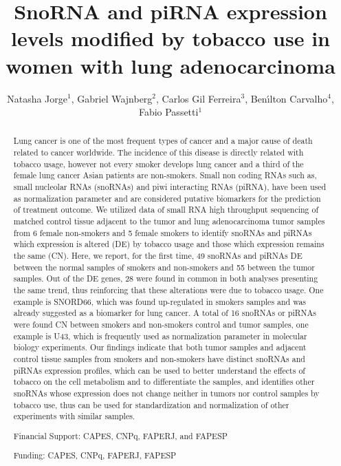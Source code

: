 \documentclass[twoside]{article}
\title{\vspace{-15mm}\fontsize{24pt}{10pt}\selectfont\textbf{SnoRNA and piRNA expression levels modified by tobacco use in women with lung adenocarcinoma}} %
\author{Natasha Jorge$^1$, Gabriel Wajnberg$^2$, Carlos Gil Ferreira$^3$, Ben\'{\i}lton Carvalho$^4$, Fabio Passetti$^1$}
\affil{1 FIOCRUZ - IOC\\ 2 FIOCRUZ-IOC\\ 3 D'OR INSTITUTE FOR RESERACH AND EDUCATION, RIO DE JANEIRO, RJ, BRAZIL\\ 4 DEPARTMENT OF STATISTICS, STATE UNICAMP, CAMPINAS, SP, BRAZIL\\ }
\date{}
\begin{document}
\maketitle %

\thispagestyle{fancy} %


\begin{abstract}
Lung cancer is one of the most frequent types of cancer and a major cause of death related to cancer worldwide. The incidence of this disease is directly related with tobacco usage, however not every smoker develops lung cancer and a third of the female lung cancer Asian patients are non-smokers. Small non coding RNAs such as, small nucleolar RNAs (snoRNAs) and piwi interacting RNAs (piRNA), have been used as normalization parameter and are considered putative biomarkers for the prediction of treatment outcome. We utilized  data of small RNA high throughput sequencing of matched  control tissue adjacent to the tumor and lung adenocarcinoma tumor samples from 6 female non-smokers and 5 female smokers to identify snoRNAs and piRNAs which expression is altered (DE) by tobacco usage and those which expression remains the same (CN). Here, we report, for the first time, 49 snoRNAs and piRNAs DE between the normal samples of smokers and non-smokers and 55 between the tumor samples. Out of the DE genes, 28 were found in common in both analyses presenting the same trend, thus reinforcing that these alterations were due to tobacco usage. One example is SNORD66, which was found up-regulated in smokers samples and was already suggested as a biomarker for lung cancer. A total of 16 snoRNAs or piRNAs were found CN between smokers and non-smokers control and tumor samples, one example is U43, which is frequently used as normalization parameter in molecular biology experiments. Our findings indicate that both tumor samples and adjacent control tissue samples from smokers and non-smokers have distinct snoRNAs and piRNAs expression profiles, which can be used to better understand the effects of tobacco on the cell metabolism and to differentiate the samples, and identifies other snoRNAs whose expression does not change neither in tumors nor control samples by tobacco use, thus can be used for standardization and normalization of other experiments with similar samples.

Financial Support: CAPES, CNPq, FAPERJ, and FAPESP

Funding: CAPES, CNPq, FAPERJ, FAPESP
\end{abstract}
\end{document}
